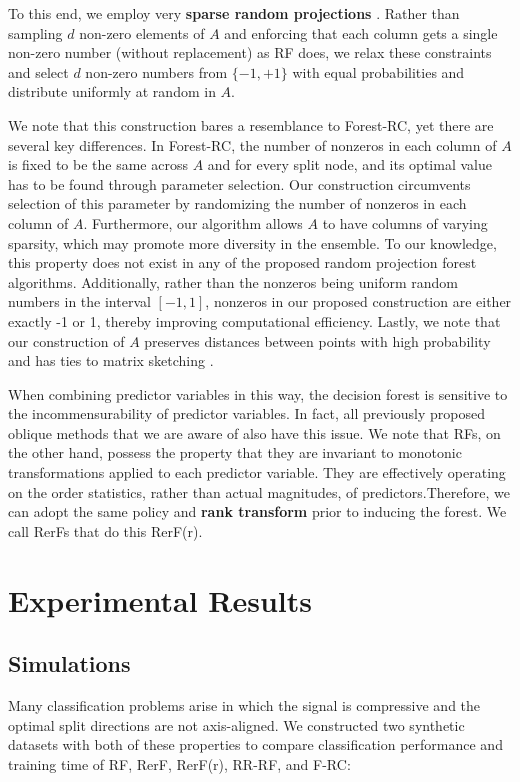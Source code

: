 \documentclass{article}
\begin{document}
To this end, we employ very {\bf{sparse random projections}} \cite{Li2006}. Rather than sampling $d$ non-zero elements of $A$ and enforcing that each column gets a single non-zero number (without replacement) as RF does, we relax these constraints and select $d$ non-zero numbers from $\{-1,+1\}$ with equal probabilities and distribute uniformly at random in $A$.

We note that this construction bares a resemblance to Forest-RC, yet there are several key differences. In Forest-RC, the number of nonzeros in each column of $A$ is fixed to be the same across $A$ and for every split node, and its optimal value has to be found through parameter selection. Our construction circumvents selection of this parameter by randomizing the number of nonzeros in each column of $A$. Furthermore, our algorithm allows $A$ to have columns of varying sparsity, which may promote more diversity in the ensemble. To our knowledge, this property does not exist in any of the proposed random projection forest algorithms. Additionally, rather than the nonzeros being uniform random numbers in the interval $[-1,1]$, nonzeros in our proposed construction are either exactly -1 or 1, thereby improving computational efficiency. Lastly, we note that our construction of $A$ preserves distances between points with high probability \cite{Li2006} and has ties to matrix sketching \cite{Liberty2013}.

When combining predictor variables in this way, the decision forest is sensitive to the incommensurability of predictor variables. In fact, all previously proposed oblique methods that we are aware of also have this issue. We note that RFs, on the other hand, possess the property that they are invariant to monotonic transformations applied to each predictor variable. They are effectively operating on the order statistics, rather than actual magnitudes, of predictors.Therefore, we can adopt the same policy and \textbf{rank transform} prior to inducing the forest. We call RerFs that do this RerF(r).

\section{Experimental Results}

\subsection{Simulations}
\label{section: sims}

Many classification problems arise in which the signal is compressive and the optimal split directions are not axis-aligned. We constructed two synthetic datasets with both of these properties to compare classification performance and training time of RF, RerF, RerF(r), RR-RF, and F-RC:
\end{document}
